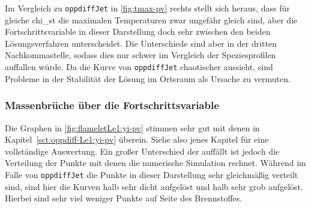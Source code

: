 Im Vergleich zu \lstinline!oppdiffJet! in \autoref{fig:tmax-pv} rechts stellt sich heraus, dass für gleiche \gls{chi_st} die maximalen Temperaturen zwar ungefähr gleich sind, aber die Fortschrittsvariable in dieser Darstellung doch sehr zwischen den beiden Lösungsverfahren unterscheidet. Die Unterschiede sind aber in der dritten Nachkommastelle, sodass dies nur schwer im Vergleich der Speziesprofilen auffallen würde. Da die Kurve von \lstinline!oppdiffJet! chaotischer aussieht, sind Probleme in der Stabilität der Lösung im Ortsraum als Ursache zu vermuten.


\subsubsection{Massenbrüche über die Fortschrittsvariable}

Die Graphen in \autoref{fig:flameletLe1:yi-pv} stimmen sehr gut mit denen in Kapitel~\ref{sct:oppdiff-Le1:yi-pv} überein. Siehe also jenes Kapitel für eine vollständige Auswertung. Ein großer Unterschied der auffällt ist jedoch die Verteilung der Punkte mit denen die numerische Simulation rechnet. Während im Falle von \lstinline!oppdiffJet! die Punkte in dieser Darstellung sehr gleichmäßig verteilt sind, sind hier die Kurven halb sehr dicht aufgelöst und halb sehr grob aufgelöst. Hierbei sind sehr viel weniger Punkte auf Seite des Brennstoffes.


